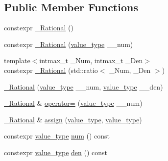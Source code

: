 \subsection*{Public Member Functions}
\begin{DoxyCompactItemize}
\item 
constexpr \hyperlink{class____gnu__cxx_1_1__Rational_ae16e40bc052c32219ce5f11d25852d82}{\+\_\+\+Rational} ()
\item 
constexpr \hyperlink{class____gnu__cxx_1_1__Rational_affaa840cee79783e14bd0a49ce59a356}{\+\_\+\+Rational} (\hyperlink{class____gnu__cxx_1_1__Rational_a7987be70fc59d0d980621fd65828b74a}{value\+\_\+type} \+\_\+\+\_\+num)
\item 
{\footnotesize template$<$intmax\+\_\+t \+\_\+\+Num, intmax\+\_\+t \+\_\+\+Den$>$ }\\constexpr \hyperlink{class____gnu__cxx_1_1__Rational_a91518eab598825b097de41c78fb4d180}{\+\_\+\+Rational} (std\+::ratio$<$ \+\_\+\+Num, \+\_\+\+Den $>$)
\item 
\hyperlink{class____gnu__cxx_1_1__Rational_ac660493bbbb5982cd108897296813d81}{\+\_\+\+Rational} (\hyperlink{class____gnu__cxx_1_1__Rational_a7987be70fc59d0d980621fd65828b74a}{value\+\_\+type} \+\_\+\+\_\+num, \hyperlink{class____gnu__cxx_1_1__Rational_a7987be70fc59d0d980621fd65828b74a}{value\+\_\+type} \+\_\+\+\_\+den)
\item 
\hyperlink{class____gnu__cxx_1_1__Rational}{\+\_\+\+Rational} \& \hyperlink{class____gnu__cxx_1_1__Rational_a600b977ae120e47f45d72cd9353fccb5}{operator=} (\hyperlink{class____gnu__cxx_1_1__Rational_a7987be70fc59d0d980621fd65828b74a}{value\+\_\+type} \+\_\+\+\_\+num)
\item 
\hyperlink{class____gnu__cxx_1_1__Rational}{\+\_\+\+Rational} \& \hyperlink{class____gnu__cxx_1_1__Rational_a0e10e52021e698f2d8e44fb900441e50}{assign} (\hyperlink{class____gnu__cxx_1_1__Rational_a7987be70fc59d0d980621fd65828b74a}{value\+\_\+type}, \hyperlink{class____gnu__cxx_1_1__Rational_a7987be70fc59d0d980621fd65828b74a}{value\+\_\+type})
\item 
constexpr \hyperlink{class____gnu__cxx_1_1__Rational_a7987be70fc59d0d980621fd65828b74a}{value\+\_\+type} \hyperlink{class____gnu__cxx_1_1__Rational_aa47045e17cac22c1f518d3f48e6124bd}{num} () const
\item 
constexpr \hyperlink{class____gnu__cxx_1_1__Rational_a7987be70fc59d0d980621fd65828b74a}{value\+\_\+type} \hyperlink{class____gnu__cxx_1_1__Rational_ad81cb4cc41bd07dca0588f0ca73a1f34}{den} () const
\item 

\end{DoxyCompactItemize}
